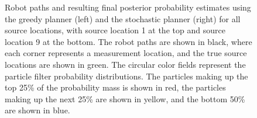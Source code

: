 \documentclass[submit, 12pt]{aiaa-pretty-modified}
\begin{document}
\begin{figure}
\begin{center}
\caption[Final posterior estimates for all trials]{
  Robot paths and resulting final posterior
  probability estimates using the greedy planner (left) and the
  stochastic planner (right) for all source locations, with source location 1
  at the top and source location 9 at the bottom. The
  robot paths are shown in black, where each corner represents a
  measurement location, and the true source locations are
  shown in green.  The circular color fields represent the particle
  filter probability distributions.  The particles making up the top 25\% of the
  probability mass is shown in red, the particles making up the next
  25\% are shown in yellow, and the bottom 50\% are shown in blue. }
\end{center}
\end{figure}
\end{document}
